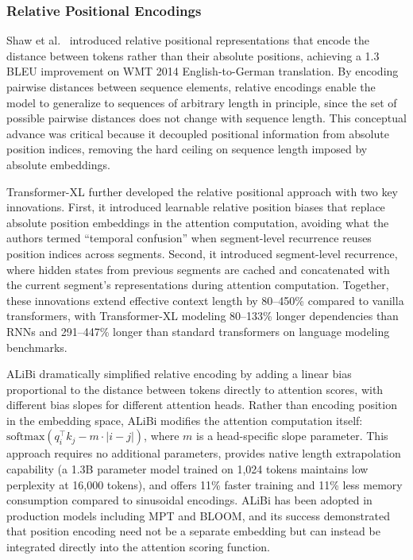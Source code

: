 \documentclass[11pt,letterpaper]{article}
\begin{document}
\subsubsection{Relative Positional Encodings}

Shaw et al.\ \cite{shaw2018self} introduced relative positional representations that encode the distance between tokens rather than their absolute positions, achieving a 1.3 BLEU improvement on WMT 2014 English-to-German translation. By encoding pairwise distances between sequence elements, relative encodings enable the model to generalize to sequences of arbitrary length in principle, since the set of possible pairwise distances does not change with sequence length. This conceptual advance was critical because it decoupled positional information from absolute position indices, removing the hard ceiling on sequence length imposed by absolute embeddings.

Transformer-XL \cite{dai2019transformerxl} further developed the relative positional approach with two key innovations. First, it introduced learnable relative position biases that replace absolute position embeddings in the attention computation, avoiding what the authors termed ``temporal confusion'' when segment-level recurrence reuses position indices across segments. Second, it introduced segment-level recurrence, where hidden states from previous segments are cached and concatenated with the current segment's representations during attention computation. Together, these innovations extend effective context length by 80--450\% compared to vanilla transformers, with Transformer-XL modeling 80--133\% longer dependencies than RNNs and 291--447\% longer than standard transformers on language modeling benchmarks.

ALiBi \cite{press2022train} dramatically simplified relative encoding by adding a linear bias proportional to the distance between tokens directly to attention scores, with different bias slopes for different attention heads. Rather than encoding position in the embedding space, ALiBi modifies the attention computation itself: $\text{softmax}(q_i^\top k_j - m \cdot |i - j|)$, where $m$ is a head-specific slope parameter. This approach requires no additional parameters, provides native length extrapolation capability (a 1.3B parameter model trained on 1,024 tokens maintains low perplexity at 16,000 tokens), and offers 11\% faster training and 11\% less memory consumption compared to sinusoidal encodings. ALiBi has been adopted in production models including MPT and BLOOM, and its success demonstrated that position encoding need not be a separate embedding but can instead be integrated directly into the attention scoring function.
\end{document}
